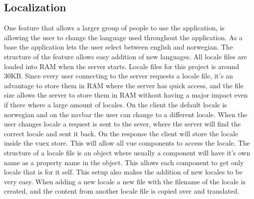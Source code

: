 \subsection{Localization}
One feature that allows a larger group of people to use the application, is allowing the user to change the language used throughout the application. As a base the application lets the user select between english and norwegian. The structure of the feature allows easy addition of new languages. All locale files are loaded into RAM when the server starts. Locale files for this project is around 30KB. Since every user connecting to the server requests a locale file, it's an advantage to store them in RAM where the server has quick access, and the file size allows the server to store them in RAM without having a major impact even if there where a large amount of locales. On the client the default locale is norwegian and on the navbar the user can change to a different locale. When the user changes locale a request is sent to the sever, where the server will find the correct locale and sent it back. On the response the client will store the locale inside the vuex store. This will allow all vue components to access the locale. The structure of a locale file is an object where usually a component will have it's own name as a property name in the object. This allows each component to get only locale that is for it self. This setup also makes the addition of new locales to be very easy. When adding a new locale a new file with the filename of the locale is created, and the content from another locale file is copied over and translated. 